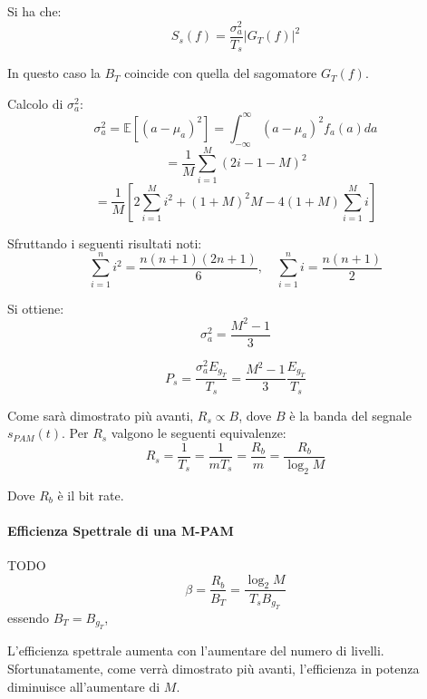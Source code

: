 Si ha che:
\[
    S_s(f) = \frac{\sigma_a^2}{T_s} |G_T(f)|^2
\]

In questo caso la $B_T$ coincide con quella del sagomatore $G_T(f)$.

Calcolo di $\sigma_a^2$:
\[
    \sigma_a^2 = \mathbb{E} \left[ (a - \mu_a)^2 \right] = \int_{-\infty}^{\infty} (a - \mu_a)^2 f_a(a) da
\]
\[
    = \frac{1}{M} \sum_{i=1}^{M} (2i - 1 - M)^2
\]
\[
    = \frac{1}{M} \left[ 2 \sum_{i=1}^{M} i^2 + (1+M)^2 M - 4(1+M) \sum_{i=1}^{M} i \right]
\]

Sfruttando i seguenti risultati noti:
\[
    \sum_{i=1}^{n} i^2 = \frac{n(n+1)(2n+1)}{6}, \quad \sum_{i=1}^{n} i = \frac{n(n+1)}{2}
\]

Si ottiene:
\[
    \sigma_a^2 = \frac{M^2 - 1}{3}
\]

\[
    P_s = \frac{\sigma_a^2 E_{g_T}}{T_s} = \frac{M^2 - 1}{3} \frac{E_{g_T}}{T_s}
\]


Come sarà dimostrato più avanti, $R_s \propto B$, dove $B$ è la banda del segnale $s_{PAM}(t)$. 
Per $R_s$ valgono le seguenti equivalenze:
\[
    R_s = \frac{1}{T_s} = \frac{1}{mT_s} = \frac{R_b}{m} = \frac{R_b}{\log_2 M}
\]

Dove $R_b$ è il bit rate.




\paragraph*{Efficienza Spettrale di una M-PAM} TODO
\[
    \beta = \frac{R_b}{B_T} = \frac{\log_2 M}{T_s B_{g_T}}
\]
essendo \( B_T = B_{g_T} \),

L'efficienza spettrale aumenta con l'aumentare del numero di livelli. Sfortunatamente, come verrà dimostrato più avanti, l'efficienza in potenza diminuisce all'aumentare di \( M \).

\begin{center}
\end{center}




